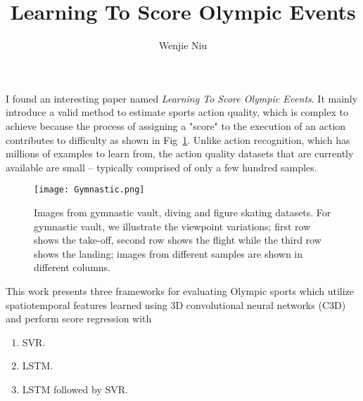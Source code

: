 \documentclass{article}
\author{Wenjie Niu}
\title{Learning To Score Olympic Events}
\begin{document}
 
\twocolumn
\maketitle
I found an interesting paper named \emph{Learning To Score Olympic Events}. It mainly introduce a valid method to estimate sports action quality, which is complex to achieve because the process of assigning a "score" to the execution of an action contributes to difficulty as shown in Fig~\ref{fig:Gymnastic}. Unlike action recognition, which has millions of examples to learn from, the action quality datasets that are currently available are small – typically comprised of only a few hundred samples.\par
\begin{figure}[H]
\centering
 \texttt{[image: Gymnastic.png]} 
 \caption{Images from gymnastic vault, diving and figure skating datasets. For gymnastic vault, we illustrate the viewpoint variations; first row shows the take-off, second row shows the flight while the third row shows the landing; images from different samples are shown in different columns.}  
 \label{fig:Gymnastic}
 \end{figure}
This work presents three frameworks for evaluating Olympic sports which utilize spatiotemporal features learned using 3D convolutional neural networks (C3D) and perform score regression with
\begin{enumerate}
\item SVR.
\item LSTM.
\item LSTM followed by SVR.
\end{enumerate}
\end{document}

